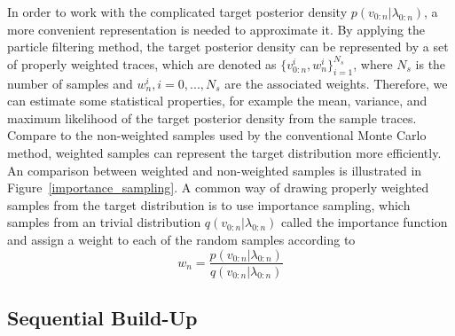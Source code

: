 In order to work with the complicated target posterior density $p({v_{0:n}}|{\lambda_{0:n}})$, a more convenient representation is needed to approximate it. By applying the particle filtering method, the target posterior density can be represented by a set of properly weighted traces, which are denoted as $\{ v_{0:n}^i,w_n^i\} _{i = 1}^{{N_s}}$, where $N_s$ is the number of samples and $ w_n^i,i = 0,...,{N_s} $ are the associated weights. Therefore, we can estimate some statistical properties, for example the mean, variance, and maximum likelihood of the target posterior density from the sample traces. Compare to the non-weighted samples used by the conventional Monte Carlo method, weighted samples can represent the target distribution more efficiently. An comparison between weighted and non-weighted samples is illustrated in Figure~\ref{importance_sampling}. A common way of drawing properly weighted samples from the target distribution is to use importance sampling, which samples from an trivial distribution $q({v_{0:n}}|{\lambda_{0:n}})$ called the importance function and assign a weight to each of the random samples according to
\begin{equation}
  w_n = \frac{{p({v_{0:n}}|{\lambda_{0:n}})}}{{q({v_{0:n}}|{\lambda_{0:n}})}}
\end{equation}

\subsection{Sequential Build-Up}


